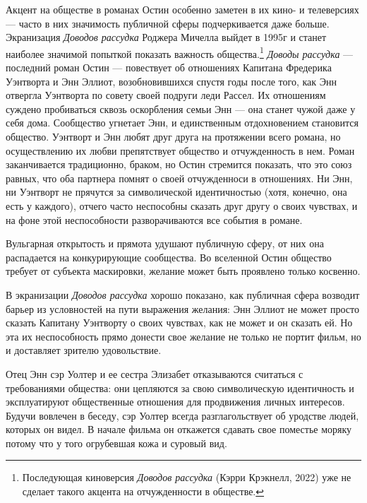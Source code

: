 \documentclass[12pt]{book}
\begin{document}
Акцент на обществе в романах Остин особенно заметен в их кино- и телеверсиях --- часто в них значимость публичной сферы подчеркивается даже больше. Экранизация \textit{Доводов рассудка} Роджера Мичелла выйдет в 1995г и станет наиболее значимой попыткой показать важность общества.\footnote{Последующая киноверсия \textit{Доводов рассудка} (Кэрри Крэкнелл, 2022) уже не сделает такого акцента на отчужденности в обществе.} \textit{Доводы рассудка} --- последний роман Остин --- повествует об отношениях Капитана Фредерика Уэнтворта и Энн Эллиот, возобновившихся спустя годы после того, как Энн отвергла Уэнтворта по совету своей подруги леди Рассел. Их отношениям суждено пробиваться сквозь оскорбления семьи Энн --- она станет чужой даже у себя дома. Сообщество угнетает Энн, и единственным отдохновением становится общество. Уэнтворт и Энн любят друг друга на протяжении всего романа, но осуществлению их любви препятствует общество и отчужденность в нем. Роман заканчивается традиционно, браком, но Остин стремится показать, что это союз равных, что оба партнера помнят о своей отчужденноси в отношениях. Ни Энн, ни Уэнтворт не прячутся за символической идентичностью (хотя, конечно, она есть у каждого), отчего часто неспособны сказать друг другу о своих чувствах, и на фоне этой неспособности разворачиваются все события в романе.

Вульгарная открытость и прямота удушают публичную сферу, от них она распадается на конкурирующие сообщества. Во вселенной Остин общество требует от субъекта маскировки, желание может быть проявлено только косвенно.

В экранизации \textit{Доводов рассудка} хорошо показано, как публичная сфера возводит барьер из условностей на пути выражения желания: Энн Эллиот не может просто сказать Капитану Уэнтворту о своих чувствах, как не может и он сказать ей. Но эта их неспособность прямо донести свое желание не только не портит фильм, но и доставляет зрителю удовольствие.

Отец Энн сэр Уолтер и ее сестра Элизабет отказываются считаться с требованиями общества: они цепляются за свою символическую идентичность и эксплуатируют общественные отношения для продвижения личных интересов. Будучи вовлечен в беседу, сэр Уолтер всегда разглагольствует об уродстве людей, которых он видел. В начале фильма он откажется сдавать свое поместье моряку потому что у того огрубевшая кожа и суровый вид.
\end{document}
